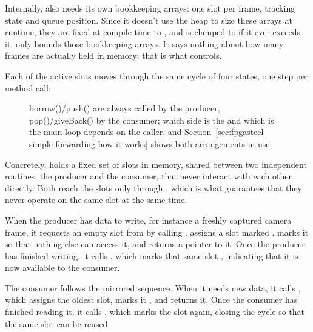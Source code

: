 Internally,  also needs its own bookkeeping arrays: one slot per frame, tracking state and queue position. Since it doesn't use the heap to size these arrays at runtime, they are fixed at compile time to , and  is clamped to  if it ever exceeds it.  only bounds those bookkeeping arrays. It says nothing about how many frames are actually held in memory; that is what  controls.

Each of the  active slots moves through the same cycle of four states, one step per method call:

\begin{landscape}
\begin{figure}[p]
    \centering
    
    \caption{borrow()/push() are always called by the producer, pop()/giveBack() by the consumer; which side is the  and which is the main loop depends on the caller, and Section~\ref{sec:fpgasteel-simple-forwarding-how-it-works} shows both arrangements in use.}
    \label{fig:fpgasteel-framepool-states}
\end{figure}
\end{landscape}

Concretely,  holds a fixed set of  slots in memory, shared between two independent routines, the producer and the consumer, that never interact with each other directly. Both reach the slots only through , which is what guarantees that they never operate on the same slot at the same time.

When the producer has data to write, for instance a freshly captured camera frame, it requests an empty slot from  by calling .  assigns a slot marked , marks it  so that nothing else can access it, and returns a pointer to it. Once the producer has finished writing, it calls , which marks that same slot , indicating that it is now available to the consumer.

The consumer follows the mirrored sequence. When it needs new data, it calls , which assigns the oldest  slot, marks it , and returns it. Once the consumer has finished reading it, it calls , which marks the slot  again, closing the cycle so that the same slot can be reused.

